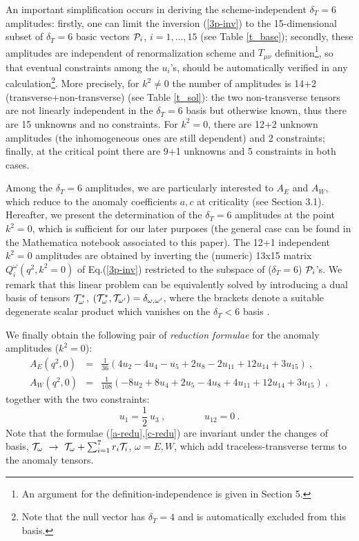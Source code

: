 \documentclass[11pt]{article}
\newcommand{\beq}{\begin{equation}}
\newcommand{\eeq}{\end{equation}}
\newcommand{\bea}{\begin{eqnarray}}
\newcommand{\eea}{\end{eqnarray}}
\def\o{\omega}
\def\dt{{\delta_T}} %
\begin{document}
An important simplification occurs in deriving
the scheme-independent $\dt=6$ amplitudes: 
firstly, one can limit the inversion (\ref{3p-inv}) to the
15-dimensional subset of $\dt=6$ basic vectors ${\cal P}_i$, $i=1,\dots,15$
(see Table \ref{t_base});  
secondly, these amplitudes are independent of renormalization 
scheme and $T_{\mu\nu}$ definition\footnote{
An argument for the definition-independence is given in Section 5.},
so that eventual constraints among the $u_i$'s,
should be automatically verified in any calculation\footnote{
Note that the null vector has $\dt=4$ and is automatically excluded from 
this basis.}.
More precisely, for $k^2\neq 0$ the
number of amplitudes is 14+2 (transverse+non-transverse)
(see Table \ref{t_sol}):
the two non-transverse tensors are not linearly 
independent in the $\dt=6$ basis but otherwise known,
thus there are 15 unknowns and no constraints.
For $k^2=0$, there are 12+2 unknown amplitudes (the inhomogeneous
ones are still dependent)
and 2 constraints; finally, at the critical point
there are 9+1 unknowns and 5 constraints in both cases. 

Among the $\dt=6$ amplitudes, we are particularly interested
to $A_E$ and $A_W$, which reduce to the anomaly
coefficients $a,c$ at criticality (see Section 3.1).
Hereafter, we present the determination of the $\dt=6$ amplitudes
at the point $k^2=0$, which is sufficient for our later 
purposes (the general case can be found in the Mathematica
notebook associated to this paper). 
The 12+1 independent $k^2=0$ amplitudes are obtained by inverting the
(numeric) 13x15 matrix $Q^\o_i(q^2,k^2=0)$ of Eq.(\ref{3p-inv}) 
restricted to the subspace of ($\dt=6$) ${\cal P}_i$'s.
We remark that this linear problem can be equivalently solved  by
introducing a dual basis of tensors ${\cal T}^*_\o$,
$\left({\cal T}^*_\o , {\cal T}_{\o'}\right) =\delta_{\o,\o'}$,
where the brackets denote a suitable degenerate scalar product
which vanishes on the $\dt <6$ basis \cite{cdgm}.

We finally obtain the following pair of {\it reduction formulae} for
the anomaly amplitudes ($k^2=0$):
\bea
A_E(q^2,0) &=& \frac{1}{36}\left(4 u_{2} - 4 u_{4} - u_{5}
+ 2 u_{8} - 2 u_{11} + 12 u_{14} + 3 u_{15} \right)\ ,
\label{a-redu}
\\
A_W(q^2,0) &=& \frac{1}{108}\left(-8 u_{2} + 8 u_{4} +2 u_{5}
-4 u_{8} +4 u_{11} + 12 u_{14} + 3 u_{15} \right)\ ,
\label{c-redu}
\eea
together with the two constraints:
\beq
u_1 = \frac{1}{2}\ u_3 \ ,\qquad\qquad
u_{12} = 0\ .
\label{u-con}
\eeq
Note that the formulae (\ref{a-redu},\ref{c-redu}) are invariant under
the changes of basis,
${\cal T}_\o \ \to\ {\cal T}_\o + \sum_{i=1}^7 r_i {\cal T}_i$,
$\o=E,W$, which add traceless-transverse terms to the anomaly tensors.
\end{document}
